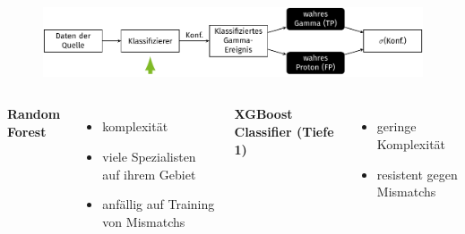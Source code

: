 \documentclass[aspectratio=1610, professionalfonts, 9pt]{beamer}
\begin{document}
\begin{frame}
  \begin{minipage}[t][0.25\textheight][t]{\textwidth}
	\begin{figure}
	  \includegraphics[scale=0.5]{./tikz/Conf/Conf2.pdf}
	\end{figure}
  \end{minipage}
  \begin{minipage}[t][0.75\textheight][t]{\textwidth}
	\begin{columns}[onlytextwidth]
	  \Large \bf Random Forest
	  \begin{itemize}
		\item komplexität
		\item viele Spezialisten auf ihrem Gebiet
		\item anfällig auf Training von Mismatchs
	  \end{itemize}
	  \Large \bf XGBoost Classifier (Tiefe 1)
	  \begin{itemize}
		\item geringe Komplexität
		\item resistent gegen Mismatchs
	  \end{itemize}
	\end{columns}
  \end{minipage}
\end{frame}
\end{document}

